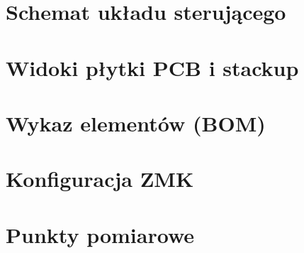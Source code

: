 \chapter{Schemat układu sterującego}\label{app:schemat}

\chapter{Widoki płytki PCB i stackup}\label{app:pcb}

\chapter{Wykaz elementów (BOM)}\label{app:bom}

\chapter{Konfiguracja ZMK}\label{app:zmk}

\chapter{Punkty pomiarowe}\label{app:tp}
